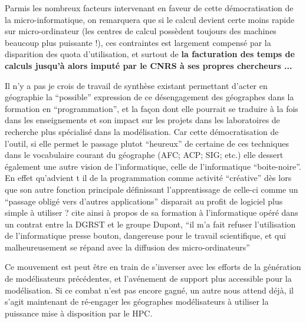 Parmis les nombreux facteurs intervenant en faveur de cette démocratisation de la micro-informatique, on remarquera que si le calcul devient certe moins rapide sur micro-ordinateur (les centres de calcul possèdent toujours des machines beaucoup plus puissante !), ces contraintes est largement compensé par la disparition des quota d'utilisation, et surtout de \textbf{la facturation des temps de calculs jusqu’à alors imputé par le CNRS à ses propres chercheurs ...}

Il n’y a pas je crois de travail de synthèse existant permettant d'acter en géographie la “possible” expression de ce désengagement des géographes dans la formation en “programmation”, et la façon dont elle pourrait se traduire à la fois dans les enseignements et son impact sur les projets dans les laboratoires de recherche plus spécialisé dans la modélisation. Car cette démocratisation de l’outil, si elle permet le passage  plutot \enquote{heureux} de certaine de ces techniques dans le vocabulaire courant du géographe (AFC; ACP; SIG; etc.) \autocite{Pumain2002} elle dessert également une autre vision de l'informatique, celle de l'informatique \enquote{boite-noire}. En effet qu’advient t il de la programmation comme activité “créative” dès lors que son autre fonction principale définissant l’apprentissage de celle-ci comme un \enquote{passage obligé vers d’autres applications} disparait au profit de logiciel plus simple à utiliser ? \textcite[4]{LeBerre1987} cite ainsi à propos de sa formation à l’informatique opéré dans un contrat entre la DGRST et le groupe Dupont, \enquote{il m’a fait refuser l’utilisation de l’informatique presse bouton, dangereuse pour le travail scientifique, et qui malheureusement se répand avec la diffusion des micro-ordinateurs}

Ce mouvement est peut être en train de s'inverser avec les efforts de la génération de modélisateurs précédentes, et l'avénement de support plus accessible pour la modélisation. Si ce combat n'est pas encore gagné, un autre nous attend déjà, il s'agit maintenant de ré-engager les géographes modélisateurs à utiliser la puissance mise à disposition par le HPC.

